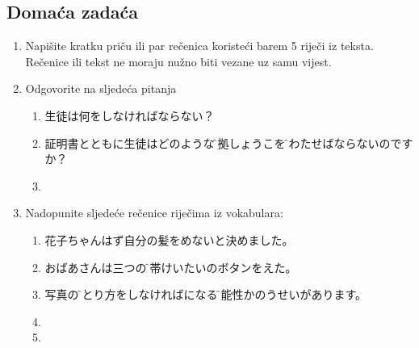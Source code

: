 \documentclass[a5paper,10pt]{tekst}
\begin{document}
	\subsection*{Domaća zadaća}
	\begin{enumerate}
		\item Napišite kratku priču ili par rečenica koristeći barem 5 riječi iz teksta. \\
		Rečenice ili tekst ne moraju nužno biti vezane uz samu vijest. 
		\item Odgovorite na sljedeća pitanja
		\begin{enumerate}
			\item 生徒は何をしなければならない？
			\item 証明書とともに生徒はどのような\f{証拠}{しょうこ}を\f{渡}{わた}せばならないのですか？
			\item \sloppy{}
		\end{enumerate}
		\item Nadopunite sljedeće rečenice riječima iz vokabulara:
		\begin{enumerate}
			\item 花子ちゃんは\ansline{}ず自分の髪を\ansline{}めないと決めました。
			\item おばあさんは三つ\ansline{}の\f{携帯}{けいたい}のボタンを\ansline{}えた。
			\item 写真の\f{撮}{と}り方を\ansline{}しなければ\ansline{}になる\f{可能性}{かのうせい}があります。
			\item\sloppy{}
			\item{}\p{\ansline{}}\p{\ansline{}}
		\end{enumerate}
	\end{enumerate}
\end{document}
